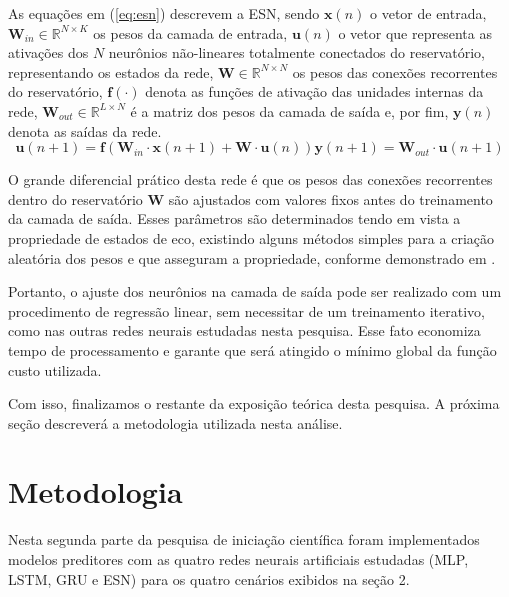 \documentclass[a4paper, 12pt]{article}
\begin{document}
As equações em (\ref{eq:esn}) descrevem a ESN, sendo $\mathbf{x}(n)$ o vetor de entrada, $\mathbf{W}_{in} \in \mathbb{R}^{N \times K}$ os pesos da camada de entrada, $\mathbf{u}(n)$ o vetor que representa as ativações dos $N$ neurônios não-lineares totalmente conectados do reservatório, representando os estados da rede, $\mathbf{W} \in \mathbb{R}^{N \times N}$ os pesos das conexões recorrentes do reservatório, $\mathbf{f}(\cdot)$ denota as funções de ativação das unidades internas da rede, $\mathbf{W}_{out} \in \mathbb{R}^{L \times N}$ é a matriz dos pesos da camada de saída e, por fim, $\mathbf{y}(n)$ denota as saídas da rede.
\begin{subequations}\label{eq:esn}
\begin{equation}
\mathbf{u}(n+1) = \mathbf{f}(\mathbf{W}_{in} \cdot \mathbf{x}(n+1) + \mathbf{W} \cdot \mathbf{u}(n))
\end{equation}
\begin{equation}
\mathbf{y}(n+1) = \mathbf{W}_{out} \cdot \mathbf{u}(n+1)
\end{equation}
\end{subequations}

O grande diferencial prático desta rede é que os pesos das conexões recorrentes dentro do reservatório $\mathbf{W}$ são ajustados com valores fixos antes do treinamento da camada de saída. Esses parâmetros são determinados tendo em vista a propriedade de estados de eco, existindo alguns métodos simples para a criação aleatória dos pesos e que asseguram a propriedade, conforme demonstrado em \cite{jaeger2007echo}. 

Portanto, o ajuste dos neurônios na camada de saída pode ser realizado com um procedimento de regressão linear, sem necessitar de um treinamento iterativo, como nas outras redes neurais estudadas nesta pesquisa. Esse fato economiza tempo de processamento e garante que será atingido o mínimo global da função custo utilizada.

Com isso, finalizamos o restante da exposição teórica desta pesquisa. A próxima seção descreverá  a metodologia utilizada nesta análise.

\section{Metodologia}

Nesta segunda parte da pesquisa de iniciação científica foram implementados modelos preditores com as quatro redes neurais artificiais estudadas (MLP, LSTM, GRU e ESN) para os quatro cenários exibidos na seção 2. 
\end{document}
